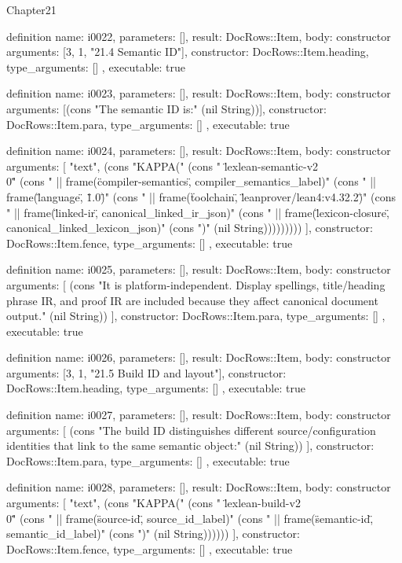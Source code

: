 \begin{lexlean}{Chapter21}
\begin{semanticmodule}
definition{
  name: i0022,
  parameters: [],
  result: DocRows::Item,
  body: constructor{
    arguments: [3, 1, "21.4 Semantic ID"],
    constructor: DocRows::Item.heading,
    type_arguments: []
  },
  executable: true
}

definition{
  name: i0023,
  parameters: [],
  result: DocRows::Item,
  body: constructor{
    arguments: [(cons "The semantic ID is:" (nil String))],
    constructor: DocRows::Item.para,
    type_arguments: []
  },
  executable: true
}

definition{
  name: i0024,
  parameters: [],
  result: DocRows::Item,
  body: constructor{
    arguments: [
      "text",
      (cons "KAPPA(" (cons "  \"lexlean-semantic-v2\\0\"" (cons "  || frame(\"compiler-semantics\", compiler_semantics_label)" (cons "  || frame(\"language\", \"1.0\")" (cons "  || frame(\"toolchain\", \"leanprover/lean4:v4.32.2\")" (cons "  || frame(\"linked-ir\", canonical_linked_ir_json)" (cons "  || frame(\"lexicon-closure\", canonical_linked_lexicon_json)" (cons ")" (nil String)))))))))
    ],
    constructor: DocRows::Item.fence,
    type_arguments: []
  },
  executable: true
}

definition{
  name: i0025,
  parameters: [],
  result: DocRows::Item,
  body: constructor{
    arguments: [
      (cons "It is platform-independent. Display spellings, title/heading phrase IR, and proof IR are included because they affect canonical document output." (nil String))
    ],
    constructor: DocRows::Item.para,
    type_arguments: []
  },
  executable: true
}

definition{
  name: i0026,
  parameters: [],
  result: DocRows::Item,
  body: constructor{
    arguments: [3, 1, "21.5 Build ID and layout"],
    constructor: DocRows::Item.heading,
    type_arguments: []
  },
  executable: true
}

definition{
  name: i0027,
  parameters: [],
  result: DocRows::Item,
  body: constructor{
    arguments: [
      (cons "The build ID distinguishes different source/configuration identities that link to the same semantic object:" (nil String))
    ],
    constructor: DocRows::Item.para,
    type_arguments: []
  },
  executable: true
}

definition{
  name: i0028,
  parameters: [],
  result: DocRows::Item,
  body: constructor{
    arguments: [
      "text",
      (cons "KAPPA(" (cons "  \"lexlean-build-v2\\0\"" (cons "  || frame(\"source-id\", source_id_label)" (cons "  || frame(\"semantic-id\", semantic_id_label)" (cons ")" (nil String))))))
    ],
    constructor: DocRows::Item.fence,
    type_arguments: []
  },
  executable: true
}


\end{semanticmodule}
\end{lexlean}
